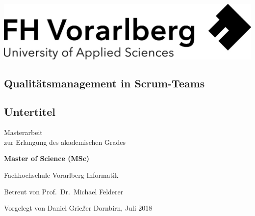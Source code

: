 \documentclass[a4paper,12pt,twoside]{scrreprt}
\begin{document}
\cleardoublepage{}
\thispagestyle{empty}
\begin{titlepage}
  \begin{flushright}
  \includegraphics[width=0.4\linewidth]{Logo-A3}
  \end{flushright}
  \begin{flushleft}
  \section*{Qualitätsmanagement in Scrum-Teams}
  \subsection*{Untertitel}
  \vspace{1.5cm}
  
  Masterarbeit\\
  zur Erlangung des akademischen Grades
  \vspace{0.5cm}
  
  \textbf{Master of Science (MSc)}

  \vspace{2cm}
  Fachhochschule Vorarlberg\newline
  Informatik

  \vspace{1cm}
  
  Betreut von\newline
  Prof.\ Dr.\ Michael Felderer
  
  \vspace{2cm}
  
  Vorgelegt von\newline
  Daniel Grießer\newline
  Dornbirn, Juli 2018
  \end{flushleft}
\end{titlepage}



\cleardoublepage\tableofcontents

\clearpage
{}
\listoffigures

\clearpage
{}
\listoftables


\end{document}
